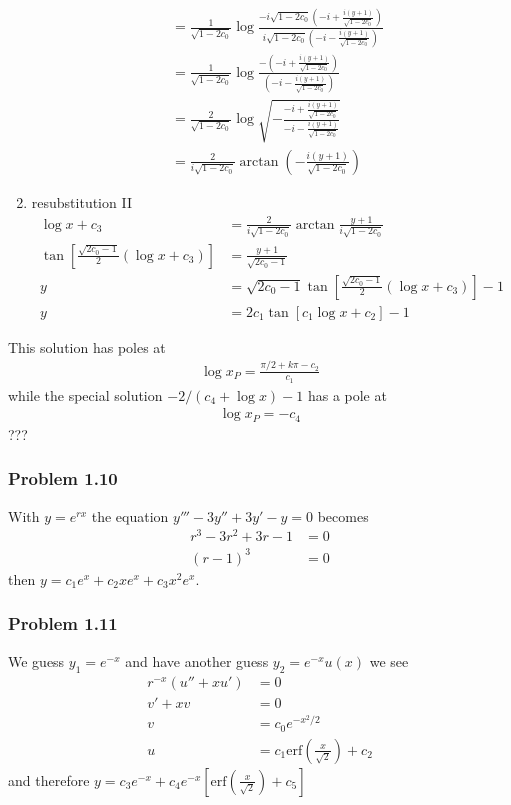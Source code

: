 \documentclass[10pt,a4paper]{article}
\theoremstyle{definition}
\begin{document}
\begin{enumerate}
\begin{align}
        &=\frac{1}{\sqrt{1-2c_0}}\log\frac{-i\sqrt{1-2c_0}\left(-i+\frac{i(y+1)}{\sqrt{1-2c_0}}\right)}{i\sqrt{1-2c_0}\left(-i-\frac{i(y+1)}{\sqrt{1-2c_0}}\right)}\\
        &=\frac{1}{\sqrt{1-2c_0}}\log\frac{-\left(-i+\frac{i(y+1)}{\sqrt{1-2c_0}}\right)}{\left(-i-\frac{i(y+1)}{\sqrt{1-2c_0}}\right)}\\
        &=\frac{2}{\sqrt{1-2c_0}}\log\sqrt{-\frac{-i+\frac{i(y+1)}{\sqrt{1-2c_0}}}{-i-\frac{i(y+1)}{\sqrt{1-2c_0}}}}\\
        &=\frac{2}{i\sqrt{1-2c_0}}\arctan\left(-\frac{i(y+1)}{\sqrt{1-2c_0}}\right)
    \end{align}
    \item resubstitution II
    \begin{align}
        \log x+c_3&=\frac{2}{i\sqrt{1-2c_0}}\arctan \frac{y+1}{i\sqrt{1-2c_0}}\\
        \tan\left[\frac{\sqrt{2c_0-1}}{2}(\log x+c_3)\right]&=\frac{y+1}{\sqrt{2c_0-1}}\\
        y&=\sqrt{2c_0-1}\tan\left[\frac{\sqrt{2c_0-1}}{2}(\log x+c_3)\right]-1\\
        y&=2c_1\tan\left[c_1\log x+c_2\right]-1
    \end{align}

\end{enumerate}
This solution has poles at
\begin{align}
    \log x_P =\frac{\pi/2+k\pi-c_2}{c_1}
\end{align}
while the special solution $-2/(c_4+\log x)-1$ has a pole at
\begin{align}
    \log x_P=-c_4
\end{align}
???

\subsubsection{Problem 1.10}
With $y=e^{rx}$ the equation $y'''-3y''+3y'-y=0$ becomes
\begin{align}
    r^3-3r^2+3r-1&=0\\
    (r-1)^3&=0
\end{align}
then $y=c_1e^x+c_2xe^x+c_3x^2e^x$.

\subsubsection{Problem 1.11}
We guess $y_1=e^{-x}$ and have another guess  $y_2=e^{-x}u(x)$ we see
\begin{align}
    r^{-x}\left(u''+xu'\right)&=0\\
    v'+xv&=0\\
    v&=c_0e^{-x^2/2}\\
    u&=c_1\text{erf}\left(\frac{x}{\sqrt{2}}\right)+c_2
\end{align}
and therefore $y=c_3e^{-x}+c_4e^{-x}\left[\text{erf}\left(\frac{x}{\sqrt{2}}\right)+c_5\right]$
\end{document}
